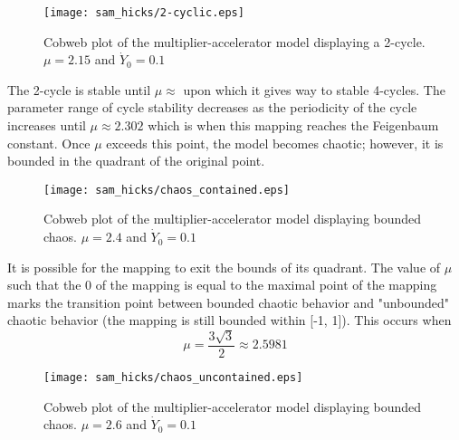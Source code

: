 \begin{figure}
    \centering
    \texttt{[image: sam\_hicks/2-cyclic.eps]}
    \caption{Cobweb plot of the multiplier-accelerator model displaying a 2-cycle. $\mu=2.15$ and $\dot Y_0=0.1$}
    \label{mult_2-cycle}
\end{figure}
The 2-cycle is stable until $\mu\approx$ upon which it gives way to stable 4-cycles. The parameter range of cycle stability decreases as the periodicity of the cycle increases until $\mu\approx2.302$ which is when this mapping reaches the Feigenbaum constant. Once $\mu$ exceeds this point, the model becomes chaotic; however, it is bounded in the quadrant of the original point.
\begin{figure}
    \centering
    \texttt{[image: sam\_hicks/chaos\_contained.eps]}
    \caption{Cobweb plot of the multiplier-accelerator model displaying bounded chaos. $\mu=2.4$ and $\dot Y_0=0.1$}
    \label{mult_bounded-chaos}
\end{figure}
It is possible for the mapping to exit the bounds of its quadrant. The value of $\mu$ such that the 0 of the mapping is equal to the maximal point of the mapping marks the transition point between bounded chaotic behavior and "unbounded" chaotic behavior (the mapping is still bounded within [-1, 1]). This occurs when 
\begin{equation*}
    \mu=\frac{3\sqrt{3}}{2}\approx2.5981
\end{equation*}
\begin{figure}
    \centering
    \texttt{[image: sam\_hicks/chaos\_uncontained.eps]}
    \caption{Cobweb plot of the multiplier-accelerator model displaying bounded chaos. $\mu=2.6$ and $\dot Y_0=0.1$}
    \label{mult_unbounded-chaos}
\end{figure}

